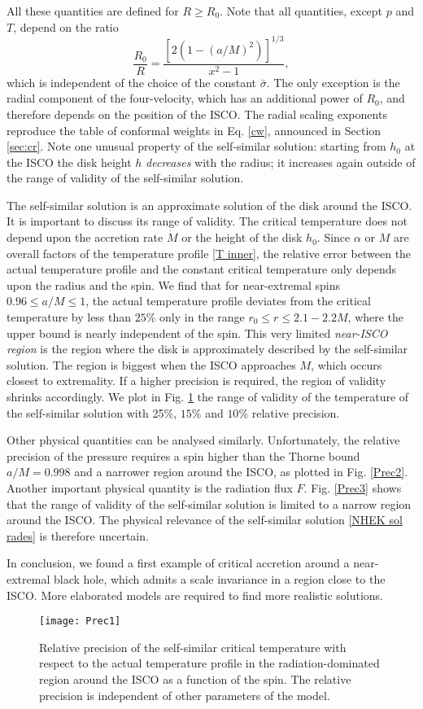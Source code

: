 \documentclass[a4paper,fleqn,usenatbib]{mnrasMOD}
\numberwithin{equation}{section}
\newcommand{\be}{\begin{equation}}
\newcommand{\ee}{\end{equation}}
\begin{document}
All these quantities are defined for $R \geq R_0$. Note that all quantities, except $p$ and $T$, depend on the ratio
\be
\frac{R_{0}}{R} = \frac{\left[2\left(1-(a/M)^2\right)\right]^{1/3}}{x^2-1},
\ee
which is independent of the choice of the constant $\bar{\sigma}$. The only exception is the radial component of the four-velocity, which has an additional power of $R_0$, and therefore depends on the position of the ISCO. The radial scaling exponents reproduce the table of conformal weights in Eq. \eqref{cw}, announced in Section \ref{sec:cr}. Note one unusual property of the self-similar solution: starting from $h_0$ at the ISCO the disk height $h$ \emph{decreases} with the radius; it increases again outside of the range of validity of the self-similar solution.


The self-similar solution is an approximate solution of the disk around the ISCO. It is important to discuss its range of validity. The critical temperature does not depend upon the accretion rate $\dot M$ or the height of the disk $h_0$. Since $\alpha$ or $M$ are overall factors of the temperature profile \eqref{T inner}, the relative error between the actual temperature profile and the constant critical temperature only depends upon the radius and the spin. We find that for near-extremal spins $0.96 \leq a/M \leq 1$, the actual temperature profile deviates from the critical temperature by less than $25\%$ only in the range $r_{0} \leq r \leq 2.1-2.2 M$, where the upper bound is nearly independent of the spin. This very limited \emph{near-ISCO region} is the region where the disk is approximately described by the self-similar solution. The region is biggest when the ISCO approaches $M$, which occurs closest to extremality. If a higher precision is required, the region of validity shrinks accordingly. We plot in Fig. \ref{Prec1} the range of validity of the temperature of the self-similar solution with 25$\%$, $15\%$ and $10\%$ relative precision. 


Other physical quantities can be analysed similarly. Unfortunately, the relative precision of the pressure requires a spin higher than the Thorne bound $a/M=0.998$ and a narrower region around the ISCO, as plotted in Fig. \ref{Prec2}. Another important physical quantity is the radiation flux $F$. Fig. \ref{Prec3} shows that the range of validity of the self-similar solution is limited to a narrow region around the ISCO. The physical relevance of the self-similar solution \eqref{NHEK sol rades} is therefore uncertain.

In conclusion, we found a first example of critical accretion around a near-extremal black hole, which admits a scale invariance in a region close to the ISCO. More elaborated models are required to find more realistic solutions. 
\begin{figure}
\centering
\texttt{[image: Prec1]}
\caption{Relative precision of the self-similar critical temperature with respect to the actual temperature profile in the radiation-dominated region around the ISCO as a function of the spin. The relative precision is independent of other parameters of the model.}
\label{Prec1}
\end{figure}
\end{document}
